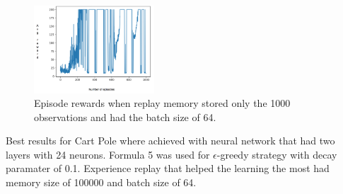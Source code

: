 \begin{figure}[H]
    \centering
    \includegraphics[width=0.4\textwidth]{images/experience_replay.png}
    \caption{
    Episode rewards when replay memory stored only the 1000 observations and had the batch size of 64.
    }
    \label{fig:experience_replay}
\end{figure}

Best results for Cart Pole where achieved with neural network that had two layers with 24 neurons. Formula 5 was used for $\epsilon$-greedy strategy with decay paramater of 0.1. Experience replay that helped the learning the most had memory size of 100000 and batch size of 64.
